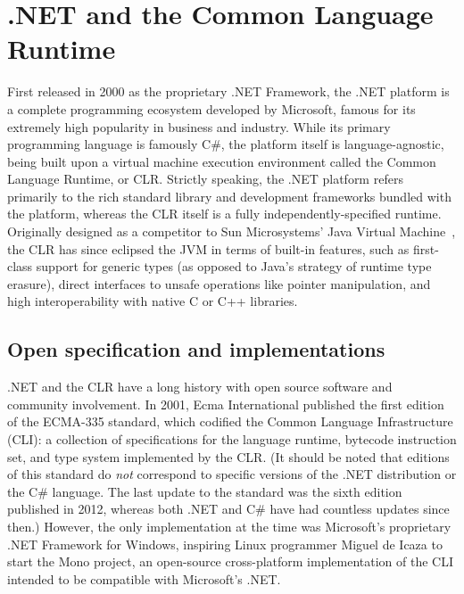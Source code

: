 \section{.NET and the Common Language Runtime}
First released in 2000 as the proprietary .NET Framework, the .NET platform is a complete programming ecosystem developed by Microsoft,
famous for its extremely high popularity in business and industry.
While its primary programming language is famously C\#, the platform itself is language-agnostic,
being built upon a virtual machine execution environment called the Common Language Runtime, or CLR.
Strictly speaking, the .NET platform refers primarily to the rich standard library and development frameworks bundled with the platform,
whereas the CLR itself is a fully independently-specified runtime.
Originally designed as a competitor to Sun Microsystems' Java Virtual Machine~\cite{20yrsdotnet},
the CLR has since eclipsed the JVM in terms of built-in features, such as first-class support for generic types
(as opposed to Java's strategy of runtime type erasure), direct interfaces to unsafe operations like pointer manipulation,
and high interoperability with native C or C++ libraries.

\subsection{Open specification and implementations}
.NET and the CLR have a long history with open source software and community involvement.
In 2001, Ecma International published the first edition of the ECMA-335 standard, which codified the Common Language Infrastructure (CLI):
a collection of specifications for the language runtime, bytecode instruction set, and type system implemented by the CLR.
(It should be noted that editions of this standard do \textit{not} correspond to specific versions of the .NET distribution or the C\# language.
The last update to the standard was the sixth edition published in 2012, whereas both .NET and C\# have had countless updates since then.)
However, the only implementation at the time was Microsoft's proprietary .NET Framework for Windows, inspiring Linux programmer Miguel de Icaza
to start the Mono project, an open-source cross-platform implementation of the CLI intended to be compatible with Microsoft's .NET.

